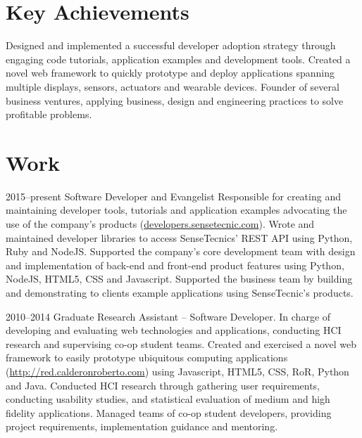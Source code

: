 \documentclass[full]{rvca}
\begin{document}
\section{Key Achievements}

\achievements
{Designed and implemented a successful developer adoption strategy through engaging code tutorials, application examples and development tools.} 
{Created a novel web framework to quickly prototype and deploy applications spanning multiple displays, sensors, actuators and wearable devices.}
{Founder of several business ventures, applying business, design and engineering practices to solve profitable problems.}
{}

\section{Work}


{2015--present}%
{Software Developer and Evangelist} %
{Responsible for creating and maintaining developer tools, tutorials and application examples advocating the use of the company's products (\href{http://developers.sensetecnic.com}{developers.sensetecnic.com}).}%
{Wrote and maintained developer libraries to access SenseTecnics' REST API using Python, Ruby and NodeJS.}
{Supported the company's core development team with design and implementation of back-end and front-end product features using Python, NodeJS, HTML5, CSS and Javascript.}
{Supported the business team by building and demonstrating to clients example applications using SenseTecnic's products.}
{}
{}

{2010--2014}%
{Graduate Research Assistant -- Software Developer.} %
{In charge of developing and evaluating web technologies and applications, conducting HCI research and supervising co-op student teams.} %
{Created and exercised a novel web framework to easily prototype ubiquitous computing applications (\href{http://red.calderonroberto.com}{http://red.calderonroberto.com}) using Javascript, HTML5, CSS, RoR, Python and Java.}
{Conducted HCI research through gathering user requirements, conducting usability studies, and statistical evaluation of medium and high fidelity applications.}
{Managed teams of co-op student developers, providing project requirements, implementation guidance and mentoring.}
{}
{}
\end{document}
